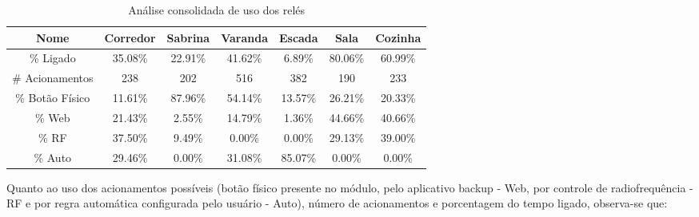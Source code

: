 \begin{table}[H]
	\caption{Análise consolidada de uso dos relés}
	\setlength\tabcolsep{1.5pt}
	\centering
	\footnotesize
	\begin{tabular}{ccccccc}
		\textbf{Nome} &
		\textbf{Corredor} &
		\textbf{Sabrina} &
		\textbf{Varanda} &
		\textbf{Escada} &
		\textbf{Sala} &
		\textbf{Cozinha} \\
		\midrule
		\% Ligado &
		35.08\% &
		22.91\% &
		41.62\% &
		6.89\% &
		80.06\% &
		60.99\% \\
		\# Acionamentos &
		238 &
		202 &
		516 &
		382 &
		190 &
		233 \\
		\% Botão Físico &
		11.61\% &
		87.96\% &
		54.14\% &
		13.57\% &
		26.21\% &
		20.33\% \\
		\% Web &
		21.43\% &
		2.55\% &
		14.79\% &
		1.36\% &
		44.66\% &
		40.66\% \\
		\% RF &
		37.50\% &
		9.49\% &
		0.00\% &
		0.00\% &
		29.13\% &
		39.00\% \\
		\% Auto &
		29.46\% &
		0.00\% &
		31.08\% &
		85.07\% &
		0.00\% &
		0.00\% \\
	\end{tabular}
\end{table}

Quanto ao uso dos acionamentos possíveis (botão físico presente no módulo, pelo aplicativo backup - Web, por controle de radiofrequência - RF e por regra automática configurada pelo usuário - Auto), número de acionamentos e porcentagem do tempo ligado, observa-se que:

